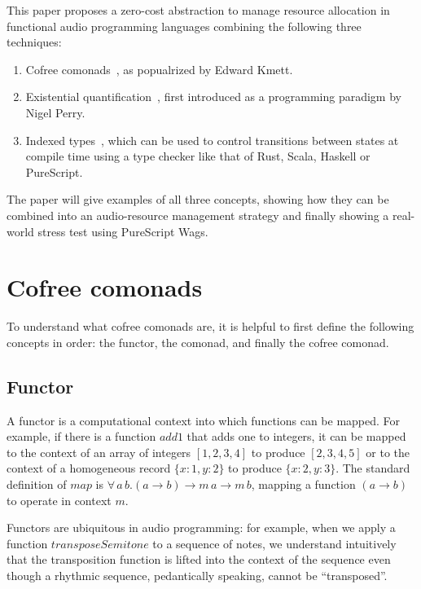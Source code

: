 \documentclass{article}
\begin{document}
This paper proposes a zero-cost abstraction to manage resource allocation in functional audio programming languages combining the following three techniques:

\begin{enumerate}
  \item Cofree comonads~\cite{kmettfree, freeman2017declarative}, as popualrized by Edward Kmett.
  \item Existential quantification~\cite{perry1991implementation, laufer1994polymorphic}, first introduced as a programming paradigm by Nigel Perry.
  \item Indexed types~\cite{zenger1997indexed}, which can be used to control transitions between states at compile time using a type checker like that of Rust, Scala, Haskell or PureScript.
\end{enumerate}

The paper will give examples of all three concepts, showing how they can be combined into an audio-resource management strategy and finally showing a real-world stress test using PureScript Wags.

\section{Cofree comonads}
\label{sec:cofree_comonads}

To understand what cofree comonads are, it is helpful to first define the following concepts in order: the functor, the comonad, and finally the cofree comonad.

\subsection{Functor}

A functor is a computational context into which functions can be mapped. For example, if there is a function $add1$ that adds one to integers, it can be mapped to the context of an array of integers $[1,2,3,4]$ to produce $[2,3,4,5]$ or to the context of a homogeneous record $\{x:1,y:2\}$ to produce $\{x:2,y:3\}$. The standard definition of $map$ is
$\forall\,a\, b. (a \rightarrow b) \rightarrow m\,a \rightarrow m\,b$, mapping a function $(a \rightarrow b)$ to operate in context $m$.

Functors are ubiquitous in audio programming: for example, when we apply a function $transposeSemitone$ to a sequence of notes, we understand intuitively that the transposition function is lifted into the context of the sequence even though a rhythmic sequence, pedantically speaking, cannot be ``transposed''.
\end{document}
